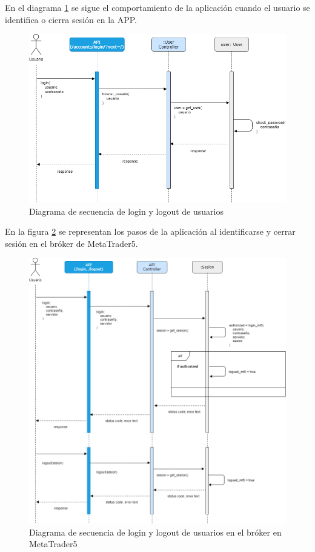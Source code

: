 En el diagrama \ref{login_logout} se sigue el comportamiento de la aplicación cuando el usuario se identifica o cierra sesión en la APP. \newline

\begin{figure}[h] 
	\includegraphics[width=1\textwidth]{imagenes/diagramas_secuencia/login_logout.png}
	\caption{Diagrama de secuencia de login y logout de usuarios} \label{login_logout}
\end{figure}

En la figura \ref{login_logout_MT5} se representan los pasos de la aplicación al identificarse y cerrar sesión en el bróker de MetaTrader5.\newline

\begin{figure}[h] 
	\includegraphics[width=1.1\textwidth]{imagenes/diagramas_secuencia/login_logout_mt5.png}
	\caption{Diagrama de secuencia de login y logout de usuarios en el bróker en MetaTrader5} \label{login_logout_MT5}
\end{figure}

